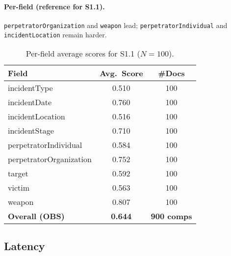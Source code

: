\paragraph{Per-field (reference for S1.1).}
\texttt{perpetratorOrganization} and \texttt{weapon} lead; \texttt{perpetratorIndividual} and \texttt{incidentLocation} remain harder.

\begin{table}[H]
    \centering
    \caption{Per-field average scores for S1.1 ($N{=}100$).}
    \label{tab:s1-perfield}
    \begin{tabular}{lcc}
        \toprule
        Field & Avg.\ Score & \#Docs \\
        \midrule
        incidentType & 0.510 & 100 \\
        incidentDate & 0.760 & 100 \\
        incidentLocation & 0.516 & 100 \\
        incidentStage & 0.710 & 100 \\
        perpetratorIndividual & 0.584 & 100 \\
        perpetratorOrganization & 0.752 & 100 \\
        target & 0.592 & 100 \\
        victim & 0.563 & 100 \\
        weapon & 0.807 & 100 \\
        \midrule
        \textbf{Overall (OBS)} & \textbf{0.644} & \textbf{900 comps} \\
        \bottomrule
    \end{tabular}
\end{table}

\subsection*{Latency}

